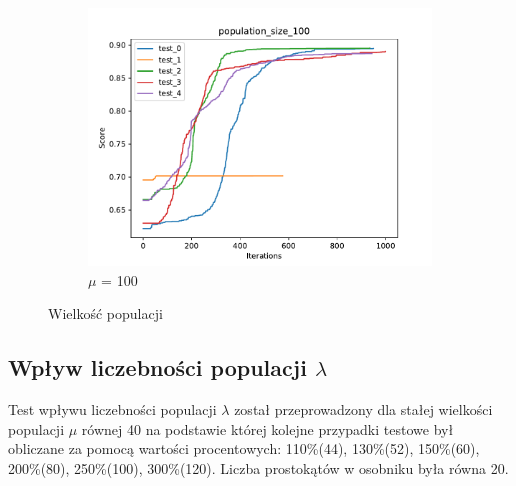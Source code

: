 \begin{figure}[H]
\begin{subfigure}[b]{0.49\linewidth}
        \includegraphics[width=\linewidth]{img/population_size_100.pdf}
        \caption{$\mu$ = 100}
    \end{subfigure}
    \caption{Wielkość populacji}
    \label{fig:picking}
\end{figure}

\subsection*{Wpływ liczebności populacji $\lambda$}
Test wpływu liczebności populacji $\lambda$ został przeprowadzony dla stałej wielkości populacji $\mu$ równej 40 na podstawie której kolejne przypadki testowe był obliczane za pomocą wartości procentowych: 110\%(44), 130\%(52),
150\%(60), 200\%(80), 250\%(100), 300\%(120). Liczba prostokątów w osobniku była równa 20.

